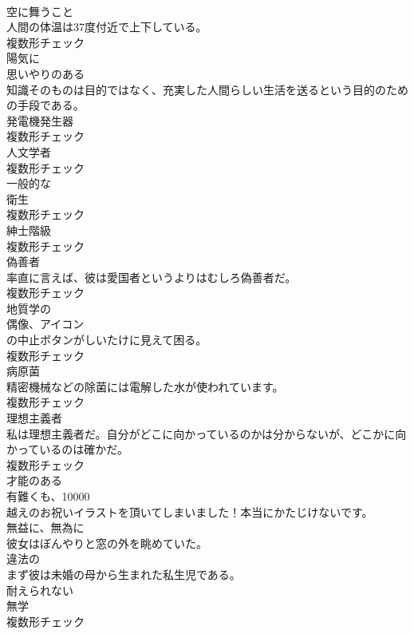 \documentclass[8pt]{extreport}
\begin{document}
\begin{CJK}{UTF8}{min}
\\	[名詞]	空に舞うこと	
\\	人間の体温は37度付近で上下している。	
\\	複数形チェック
\\	[副詞]	陽気に	
\\	[形容詞]	思いやりのある	
\\	知識そのものは目的ではなく、充実した人間らしい生活を送るという目的のための手段である。	
\\	[名詞]	発電機発生器	
\\	複数形チェック
\\	[名詞]	人文学者	
\\	複数形チェック
\\	[形容詞]	一般的な	
\\	[名詞]	衛生	
\\	複数形チェック
\\	[名詞]	紳士階級	
\\	複数形チェック
\\	[名詞]	偽善者	
\\	率直に言えば、彼は愛国者というよりはむしろ偽善者だ。	
\\	複数形チェック
\\	[形容詞]	地質学の	
\\	[名詞]	偶像、アイコン	
\\	の中止ボタンがしいたけに見えて困る。	
\\	複数形チェック
\\	[名詞]	病原菌	
\\	精密機械などの除菌には電解した水が使われています。	
\\	複数形チェック
\\	[名詞]	理想主義者	
\\	私は理想主義者だ。自分がどこに向かっているのかは分からないが、どこかに向かっているのは確かだ。	
\\	複数形チェック
\\	[形容詞]	才能のある	
\\	有難くも、10000
\\	越えのお祝いイラストを頂いてしまいました！本当にかたじけないです。	
\\	[副詞]	無益に、無為に	
\\	彼女はぼんやりと窓の外を眺めていた。	
\\	[形容詞]	違法の	
\\	まず彼は未婚の母から生まれた私生児である。	
\\	[形容詞]	耐えられない	
\\	[名詞]	無学	
\\	複数形チェック

\end{CJK}
\end{document}
